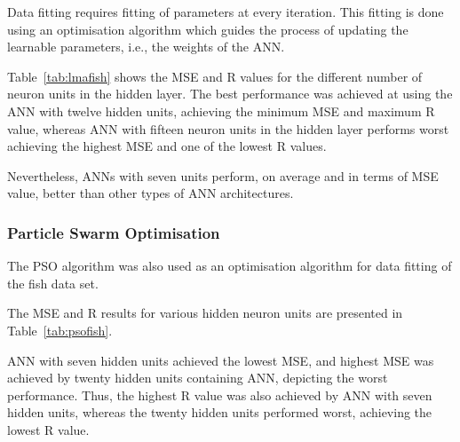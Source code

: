 Data fitting requires fitting of parameters at every iteration. This fitting is done using an optimisation algorithm which guides the process of updating the learnable parameters, i.e., the weights of the ANN.

Table~\ref{tab:lmafish} shows the MSE and R values for the different number of neuron units in the hidden layer. The best performance was achieved at using the ANN with twelve hidden units, achieving the minimum MSE and maximum R value, whereas ANN with fifteen neuron units in the hidden layer performs worst achieving the highest MSE and one of the lowest R values. 

\begin{table}[htbp]
    \centering
    \caption{Summary of tests performed with LMA for fish test data set.}
    \label{tab:lmafish}
\end{table}

Nevertheless, ANNs with seven units perform, on average and in terms of MSE value, better than other types of ANN architectures. 

\subsubsection{Particle Swarm Optimisation}

The PSO algorithm was also used as an optimisation algorithm for data fitting of the fish data set.

The MSE and R results for various hidden neuron units are presented in Table~\ref{tab:psofish}.

ANN with seven hidden units achieved the lowest MSE, and highest MSE was achieved by twenty hidden units containing ANN, depicting the worst performance. Thus, the highest R value was also achieved by ANN with seven hidden units, whereas the twenty hidden units performed worst, achieving the lowest R value.

